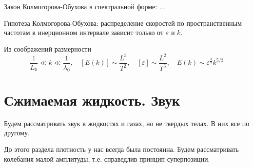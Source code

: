 Закон Колмогорова-Обухова в спектральной форме:
...

Гипотеза Колмогорова-Обухова: распределение скоростей по пространственным
частотам в инерционном интервале зависит только от $\varepsilon$ и $k$.

Из соображений размерности
\begin{equation}
    \frac{1}{L_0} \ll k \ll \frac{1}{\lambda_0}, \quad
    [E(k)] \sim \frac{L^3}{T^2}, \quad [\varepsilon]\sim \frac{L^2}{T^3},
    \quad  E(k) \sim \varepsilon^\frac{3}{2} k^{5/3}
\end{equation}

\section{Сжимаемая жидкость. Звук}

%
Будем рассматривать звук в жидкостях и газах, но не твердых телах.
В них все по другому. 

До этого раздела плотность у нас всегда была постоянна. Будем 
рассматривать колебания малой амплитуды, т.е. справедлив принцип
суперпозиции.

